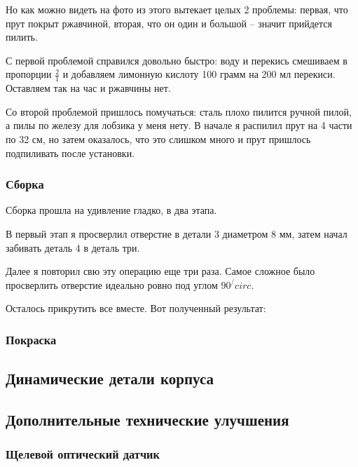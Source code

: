 \documentclass[a4paper, 12pt]{article}
\begin{document}
Но как можно видеть на фото из этого вытекает целых 2 проблемы: первая, что
прут покрыт ржавчиной, вторая, что он один и большой -- значит прийдется
пилить.

С первой проблемой справился довольно быстро: воду и перекись смешиваем в
пропорции $\frac{2}{1}$ и добавляем лимонную кислоту 100 грамм на 200 мл
перекиси. Оставляем так на час и ржавчины нет.


Со второй проблемой пришлось помучаться: сталь плохо пилится ручной пилой,
а пилы по железу для лобзика у меня нету. В начале я распилил прут на 4 части
по 32 см, но затем оказалось, что это слишком много и прут пришлось подпиливать
после установки.

\subsubsection{Сборка}

Сборка прошла на удивление гладко, в два этапа.

В первый этап я просверлил отверстие в детали 3 диаметром 8 мм, затем
начал забивать деталь 4 в деталь три.


Далее я повторил свю эту операцию еще три раза. Самое сложное было просверлить
отверстие идеально ровно под углом $90^/circ$.


Осталось прикрутить все вместе. Вот полученный результат:


\subsubsection{Покраска}
\newpage

\subsection{Динамические детали корпуса}


\subsection{Дополнительные технические улучшения}

\subsubsection{Щелевой оптический датчик}
\end{document}
